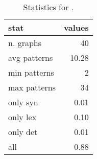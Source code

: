 \begin{table}[t]
    \centering
\begin{tabular}{lr}
\toprule
         stat &   values \\
\midrule
    n. graphs &    40 \\
 avg patterns &    10.28 \\
 min patterns &     2 \\
 max patterns &    34 \\
     only syn &     0.01 \\
     only lex &     0.10 \\
     only det &     0.01 \\
          all &     0.88 \\
\bottomrule
\end{tabular}
    \caption{Statistics for \resource{}.}
    \label{tab:rel-graph-stats}
\end{table}